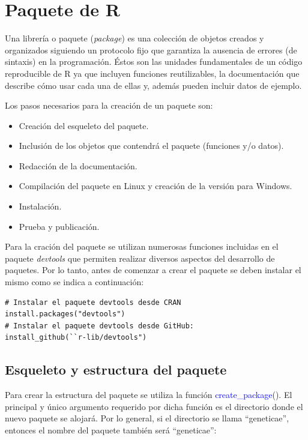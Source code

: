 \section{Paquete de R}

Una librería o paquete (\emph{package}) es una colección de objetos creados y organizados siguiendo un protocolo fijo que garantiza la ausencia de errores (de sintaxis) en la programación. Éstos son las unidades fundamentales de un código reproducible de R ya que incluyen funciones reutilizables, la documentación que describe cómo usar cada una de ellas y, además pueden incluir datos de ejemplo. 

Los pasos necesarios para la creación de un paquete son:
\begin{itemize}
\item Creación del esqueleto del paquete.
\item Inclusión de los objetos que contendrá el paquete (funciones y/o datos).
\item Redacción de la documentación.
\item Compilación del paquete en Linux y creación de la versión para Windows.
\item Instalación.
\item Prueba y publicación.
\end{itemize}


Para la cración del paquete se utilizan numerosas funciones incluidas en el paquete \emph{devtools} que permiten realizar diversos aspectos del desarrollo de paquetes. Por lo tanto, antes de comenzar a crear el paquete se deben instalar el mismo como se indica a continuación:

\begin{lstlisting}
# Instalar el paquete devtools desde CRAN
install.packages("devtools")
# Instalar el paquete devtools desde GitHub:
install_github(``r-lib/devtools")
\end{lstlisting}

\subsection{Esqueleto y estructura del paquete}

Para crear la estructura del paquete se utiliza la función \textcolor{blue}{create\_package}(). El principal y único argumento requerido por dicha función es el directorio donde el nuevo paquete se alojará. Por lo general, si el directorio se llama ``geneticae'', entonces el nombre del paquete también será ``geneticae'':


